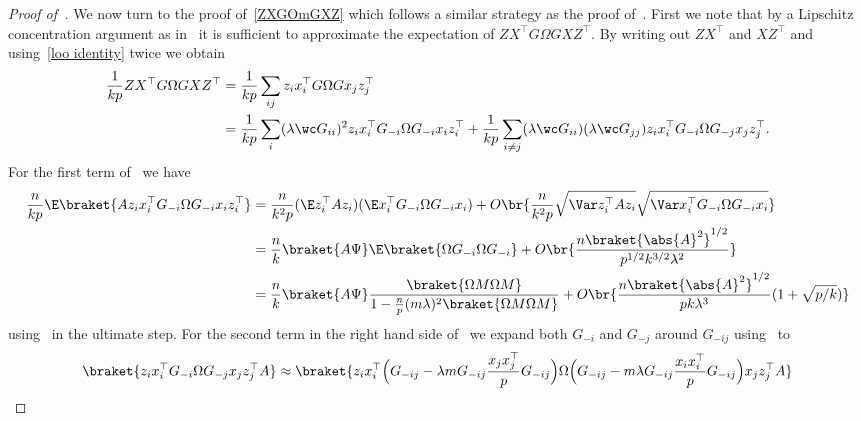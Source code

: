\begin{proof}[Proof of~]
    We now turn to the proof of~\eqref{ZXGOmGXZ} which follows a similar strategy as the proof of~. First we note that by a Lipschitz concentration argument as in~ it is sufficient to approximate the expectation of $ZX^\top G \Omega G X Z^\top$.
    By writing out $ZX^\top$ and $X Z^\top$ and using~\cref{loo identity} twice we obtain
    \begin{equation}\label{ZXGGXZ exp}
        \begin{split}
            \frac{1}{kp}ZX^{\top}G\Omega G XZ^{\top} &= \frac{1}{kp}\sum_{ij} z_i x_i^\top G \Omega G x_j z_j^\top\\
            &= \frac{1}{kp} \sum_i (\lambda \wc G_{ii})^2 z_i x_i^\top G_{-i} \Omega G_{-i} x_i z_i^\top + \frac{1}{kp} \sum_{i\ne j} (\lambda \wc G_{ii})(\lambda \wc G_{jj}) z_i x_i^\top G_{-i} \Omega G_{-j} x_j z_j^\top.
        \end{split}
    \end{equation}
    For the first term of~ we have
    \begin{equation}
        \begin{split}
            \frac{n}{kp}\E\braket{Az_i x_i^\top G_{-i} \Omega G_{-i} x_i z_i^\top} &= \frac{n}{k^2p} (\E z_i^\top A z_i) (\E x_i^\top G_{-i} \Omega G_{-i} x_i)+O\br{\frac{n}{k^2p} \sqrt{\Var z_i^\top A z_i}\sqrt{\Var x_i^\top G_{-i} \Omega G_{-i} x_i} }\\
            &= \frac{n}{k} \braket{A\Psi} \E \braket{\Omega G_{-i}\Omega G_{-i}} + O\br{\frac{n\braket{\abs{A}^2}^{1/2}}{p^{1/2}k^{3/2}\lambda^2}}\\
            &= \frac{n}{k} \braket{A\Psi}\frac{\braket{ \Omega M \Omega M}}{1- \frac{n}{p}(m\lambda)^2 \braket{\Omega M \Omega M}} + O\br{\frac{n\braket{\abs{A}^2}^{1/2}}{pk\lambda^3}(1+\sqrt{p/k})}
        \end{split}
    \end{equation}
    using~ in the ultimate step. For the second term in the right hand side of~ we expand both $G_{-i}$ and $G_{-j}$ around $G_{-ij}$ using~ to
    \begin{equation}\label{xxGOmGxxA}
        \begin{split}
            \braket{z_i x_i^\top G_{-i} \Omega G_{-j} x_j z_j^\top A} &\approx \braket{z_i x_i^\top \Bigl(G_{-ij}- \lambda m G_{-ij}\frac{x_jx_j^\top}{p}G_{-ij}\Bigr) \Omega \Bigl(G_{-ij}-m\lambda G_{-ij}\frac{x_ix_i^\top}{p}G_{-ij}\Bigr) x_j z_j^\top A}\\

\end{split}
\end{equation}
\end{proof}
